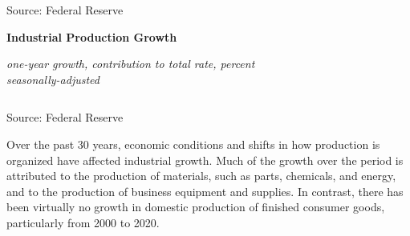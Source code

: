 \documentclass{report}
\makeatletter
\newcommand{\tbllink}[1]{\href{https://raw.githubusercontent.com/bdecon/US-chartbook/master/chartbook/data/#1}{\faTable}}
\newcommand*\short[1]{\expandafter\@gobbletwo\number\numexpr#1\relax}
\newcommand{\shdateaxisticks}{
		date coordinates in=x, axis line style={draw=none},
		xmax={2024-01-31},
		max space between ticks=40,	    
		xtick={{1990-01-01}, {1995-01-01}, {2000-01-01}, 
			{2005-01-01}, {2010-01-01}, {2015-01-01}, {2020-01-01}},
		minor xtick={},
		enlarge y limits={0.06}, enlarge x limits={0.01},
		xticklabel style={align=center, yshift=-2pt}, tick label style={inner sep=0pt},
		}
\newcommand{\bbar}[2]{extra #1 ticks = {{#2}}, extra #1 tick labels = ,
		extra #1 tick style = {grid=major, grid style={thick, black!25}},}
\newcommand{\stdline}[4]{\addplot[very thick, no markers, color=#1] 
		table [x=#2, y=#3, col sep=comma] {#4};	}
\newcommand{\thinline}[4]{\addplot[no markers, color=#1] 
		table [x=#2, y=#3, col sep=comma] {#4};	}
\newcommand{\rbars}{
		\fill[color=black!10] (axis cs:{1990-07-01},\pgfkeysvalueof{/pgfplots/ymin})
			rectangle (axis cs:{1991-03-01}, \pgfkeysvalueof{/pgfplots/ymax});
		\fill[color=black!10] (axis cs:{2007-12-01},\pgfkeysvalueof{/pgfplots/ymin})
			rectangle (axis cs:{2009-07-01}, \pgfkeysvalueof{/pgfplots/ymax});
		\fill[color=black!10] (axis cs:{2001-03-01},\pgfkeysvalueof{/pgfplots/ymin})
			rectangle (axis cs:{2001-11-01}, \pgfkeysvalueof{/pgfplots/ymax});
		\fill[color=black!10] (axis cs:{2020-02-01},\pgfkeysvalueof{/pgfplots/ymin})
			rectangle (axis cs:{2020-05-01}, \pgfkeysvalueof{/pgfplots/ymax});}
\makeatother
\begin{document}
{\begin{minipage}{0.48\textwidth}
\hspace{4mm}

\footnotesize{Source: Federal Reserve} \hfill \tbllink{indpro.csv}
\end{minipage}
\vspace{1mm} 

\begin{minipage}{1.0\textwidth}
\normalsize \textbf{Industrial Production Growth}\\
\footnotesize{\textit{one-year growth, \hspace{27mm} contribution to total \hspace{10mm} rate, percent}\\
\footnotesize{\textit{seasonally-adjusted}}
\vspace*{-7mm}

\hspace*{-2mm}  \setlength{\tabcolsep}{3.7pt} \color{black!90}
		{\renewcommand{\arraystretch}{1.46}
		 \begin{tabular}{p{42mm} R{6.6mm} R{6.6mm} R{6.6mm} R{6.6mm} | 
		 R{6.8mm} R{6.6mm} R{6.6mm} R{6.6mm} }
			  \hline
		\end{tabular}}\vspace{-2mm}
		
\footnotesize{Source: Federal Reserve} \hfill \tbllink{indpro_table.csv}}
\end{minipage}
\newpage
\vspace*{-11mm}

\begin{minipage}{1.0\textwidth} 
\small Over the past 30 years, economic conditions and shifts in how production is organized have affected industrial growth. Much of the growth over the period is attributed to the production of materials, such as parts, chemicals, and energy, and to the production of business equipment and supplies. In contrast, there has been virtually no growth in domestic production of finished consumer goods, particularly from 2000 to 2020. 


\end{minipage}}
\end{document}

